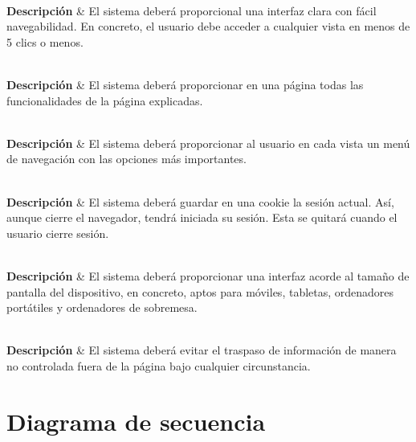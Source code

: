 {
     \\
    \hline
    \textbf{Descripción} & El sistema deberá proporcional una interfaz clara con fácil navegabilidad. En concreto, el usuario debe acceder a cualquier vista en menos de 5 clics o menos. \\
}

{
     \\
    \hline
    \textbf{Descripción} & El sistema deberá proporcionar en una página todas las funcionalidades de la página explicadas. \\
}

{
     \\
    \hline
    \textbf{Descripción} & El sistema deberá proporcionar al usuario en cada vista un menú de navegación con las opciones más importantes. \\
}

{
     \\
    \hline
    \textbf{Descripción} & El sistema deberá guardar en una cookie la sesión actual. Así, aunque cierre el navegador, tendrá iniciada su sesión. Esta se quitará cuando el usuario cierre sesión. \\
}

{
     \\
    \hline
    \textbf{Descripción} & El sistema deberá proporcionar una interfaz acorde al tamaño de pantalla del dispositivo, en concreto, aptos para móviles, tabletas, ordenadores portátiles y ordenadores de sobremesa. \\
}

{
     \\
    \hline
    \textbf{Descripción} & El sistema deberá evitar el traspaso de información de manera no controlada fuera de la página bajo cualquier circunstancia. \\
}


\section{Diagrama de secuencia}\label{sec:diagrama_secuencia}
